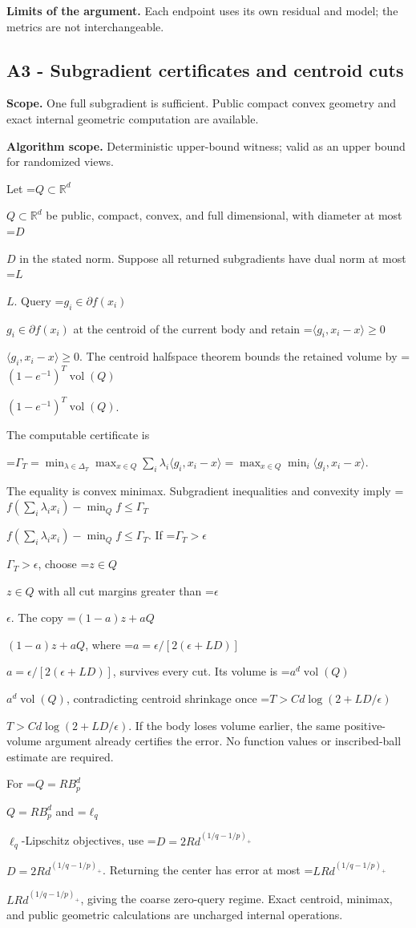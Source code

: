 \documentclass[10pt,a4paper]{article}
\newcommand{\AtlasMath}[1]{\par\begingroup\centering\setbox0=\hbox{$\displaystyle #1$}\ifdim\wd0>1.4\linewidth\typeout{ATLAS WIDE FORMULA: \the\wd0}\fi\ifdim\wd0>\linewidth\resizebox{\linewidth}{!}{\box0}\else\box0\fi\par\endgroup}
\newcommand{\AtlasInlineMath}[1]{\begingroup\setbox0=\hbox{$#1$}\ifdim\wd0>.4\linewidth\endgroup\AtlasMath{#1}\else\endgroup$#1$\fi}
\begin{document}
\textbf{Limits of the argument.} Each endpoint uses its own residual and model; the metrics are not interchangeable.

\subsection{A3 - Subgradient certificates and centroid cuts}
\textbf{Scope.} One full subgradient is sufficient. Public compact convex geometry and exact internal geometric computation are available.

\textbf{Algorithm scope.} Deterministic upper-bound witness; valid as an upper bound for randomized views.

Let \AtlasInlineMath{Q\subset\mathbb R^d} be public, compact, convex, and full dimensional, with diameter at most \AtlasInlineMath{D} in the stated norm. Suppose all returned subgradients have dual norm at most \AtlasInlineMath{L}. Query \AtlasInlineMath{g_i\in\partial f(x_i)} at the centroid of the current body and retain \AtlasInlineMath{\langle g_i,x_i-x\rangle\ge0}. The centroid halfspace theorem bounds the retained volume by \AtlasInlineMath{(1-e^{-1})^T\operatorname{vol}(Q)}.

The computable certificate is

\AtlasMath{\Gamma_T=\min_{\lambda\in\Delta_T}\max_{x\in Q}\sum_i\lambda_i\langle g_i,x_i-x\rangle
=\max_{x\in Q}\min_i\langle g_i,x_i-x\rangle.}

The equality is convex minimax. Subgradient inequalities and convexity imply
\AtlasInlineMath{f(\sum_i\lambda_ix_i)-\min_Qf\le\Gamma_T}.
If \AtlasInlineMath{\Gamma_T>\epsilon}, choose \AtlasInlineMath{z\in Q} with all cut margins greater than \AtlasInlineMath{\epsilon}. The copy \AtlasInlineMath{(1-a)z+aQ}, where \AtlasInlineMath{a=\epsilon/[2(\epsilon+LD)]}, survives every cut. Its volume is \AtlasInlineMath{a^d\operatorname{vol}(Q)}, contradicting centroid shrinkage once \AtlasInlineMath{T>C d\log(2+LD/\epsilon)}. If the body loses volume earlier, the same positive-volume argument already certifies the error. No function values or inscribed-ball estimate are required.

For \AtlasInlineMath{Q=RB_p^d} and \AtlasInlineMath{\ell_q}-Lipschitz objectives, use \AtlasInlineMath{D=2Rd^{(1/q-1/p)_+}}. Returning the center has error at most \AtlasInlineMath{LRd^{(1/q-1/p)_+}}, giving the coarse zero-query regime. Exact centroid, minimax, and public geometric calculations are uncharged internal operations.
\end{document}
